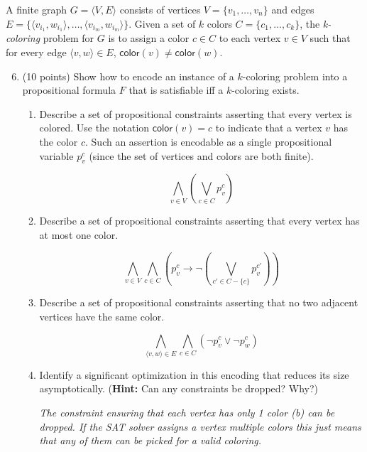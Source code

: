\documentclass{article}
\newenvironment{solution}{\color{blue} \em }{}
\begin{document}
A finite graph $G = \langle V, E\rangle$ consists of vertices $V=\{v_1,\ldots,v_n\}$ and edges $E=\{\langle v_{i_1}, w_{i_1}\rangle,\ldots,\langle v_{i_m}, w_{i_m}\rangle\}$.  Given a set of $k$ colors $C=\{c_1,\ldots,c_k\}$, the \emph{k-coloring} problem for $G$ is to assign a color $c\in C$  to each vertex $v\in V$ such that for every edge $\langle v,w\rangle\in E$, $\mathsf{color}(v)\neq\mathsf{color}(w)$.

\begin{enumerate}
	\setcounter{enumi}{5}
\item (10 points) Show how to encode an instance of a $k$-coloring problem into a propositional formula $F$ that is satisfiable iff a $k$-coloring exists.
\begin{enumerate}
\item Describe a set of propositional constraints asserting that every vertex is colored.  Use the notation $\mathsf{color}(v) = c$ to indicate that a vertex $v$ has the color $c$.  Such an assertion is encodable as a single propositional variable $p^c_v$ (since the set of vertices and colors are both finite).

\begin{solution}
    $$\bigwedge_{v \in V} (\bigvee_{c \in C} p^c_v)  $$
\end{solution}

\item Describe a set of propositional constraints asserting that every vertex has at most one color.

\begin{solution}
    $$\bigwedge_{v \in V} \bigwedge_{c \in C} (p^c_v \rightarrow \neg (\bigvee_{c' \in C- \{c\}} p^{c'}_v))  $$
\end{solution}

\item Describe a set of propositional constraints asserting that no two adjacent vertices have the same color.

\begin{solution}
    $$\bigwedge_{\langle v, w \rangle \in E} \bigwedge_{c \in C} (\neg p_v^c \lor \neg p_w^c)  $$
\end{solution}

\item Identify a significant optimization in this encoding that reduces its size asymptotically.  (\textbf{Hint:} Can any constraints be dropped?  Why?)

\begin{solution}
    The constraint ensuring that each vertex has only 1 color (b) can be dropped.
    If the SAT solver assigns a vertex multiple colors this just means that any of them
    can be picked for a valid coloring.
\end{solution}


\end{enumerate}
\end{enumerate}
\end{document}
